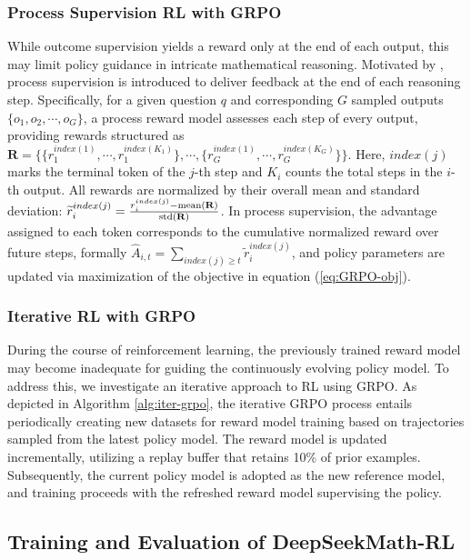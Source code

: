 \subsubsection{Process Supervision RL with GRPO} While outcome supervision yields a reward only at the end of each output, this may limit policy guidance in intricate mathematical reasoning. Motivated by \cite{wang2023math}, process supervision is introduced to deliver feedback at the end of each reasoning step. Specifically, for a given question $q$ and corresponding $G$ sampled outputs $\{o_1, o_2, \cdots, o_G\}$, a process reward model assesses each step of every output, providing rewards structured as $\mathbf{R} = \{ \{r_1^{index(1)},\cdots,r_1^{index(K_1)}\}, \cdots,  \{r_G^{index(1)},\cdots,r_G^{index(K_G)}\} \}$. Here, $index(j)$ marks the terminal token of the $j$-th step and $K_i$ counts the total steps in the $i$-th output. All rewards are normalized by their overall mean and standard deviation: $\widetilde{r}_i^{index(j)} = \frac{r_i^{index(j)} - {\rm mean(\mathbf{R})}}{{\rm std(\mathbf{R})}}$.
In process supervision, the advantage assigned to each token corresponds to the cumulative normalized reward over future steps, formally $\hat{A}_{i, t} = \sum_{index(j) \ge t} \widetilde{r}_i^{index(j)}$,
and policy parameters are updated via maximization of the objective in equation (\ref{eq:GRPO-obj}).

\subsubsection{Iterative RL with GRPO} During the course of reinforcement learning, the previously trained reward model may become inadequate for guiding the continuously evolving policy model. To address this, we investigate an iterative approach to RL using GRPO. As depicted in Algorithm \ref{alg:iter-grpo}, the iterative GRPO process entails periodically creating new datasets for reward model training based on trajectories sampled from the latest policy model. The reward model is updated incrementally, utilizing a replay buffer that retains 10\% of prior examples. Subsequently, the current policy model is adopted as the new reference model, and training proceeds with the refreshed reward model supervising the policy.

\subsection{Training and Evaluation of DeepSeekMath-RL}

